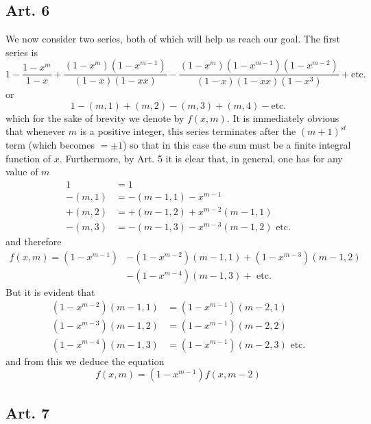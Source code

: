 \documentclass{book}
\theoremstyle{plain}
\theoremstyle{remark}
\begin{document}
\subsection*{Art. 6} 

We now consider two series, both of which will help us reach our goal.  The first series is 
\[ 1 - \frac{1-x^m}{1-x} + \frac{(1-x^m)(1-x^{m-1})}{(1-x)(1-xx)} - \frac{(1-x^m)(1-x^{m-1})(1-x^{m-2})}{(1-x)(1-xx)(1-x^3)} + \textrm{etc.} \]
or 
\[ 1 - (m,1)+(m,2)-(m,3)+(m,4) - \textrm{etc.} \]
which for the sake of brevity we denote by $f(x,m)$.  It is immediately obvious that whenever $m$ is a positive integer, this series terminates after the $(m+1)^{st}$ term (which becomes $=\pm1$) so that in this case the sum must be a finite integral function of $x$.  Furthermore, by Art. 5 it is clear that, in general, one has for any value of $m$ 
\begin{align*} 
1 &= 1 \\
-(m,1) &= -(m-1,1)-x^{m-1} \\
+(m,2) &= +(m-1,2) + x^{m-2} (m-1,1) \\
-(m,3) &= -(m-1,3) - x^{m-3} (m-1,2) \textrm{ etc.} 
\end{align*}
and therefore
\begin{align*} f(x,m) = (1-x^{m-1}) &- (1-x^{m-2})(m-1,1) + (1-x^{m-3})(m-1,2)  \\
&-(1-x^{m-4}) (m-1,3) + \textrm{ etc.} \end{align*}
But it is evident that
\begin{align*}
 (1-x^{m-2})(m-1,1) &= (1-x^{m-1}) (m-2,1) \\
(1-x^{m-3})(m-1,2) &= (1-x^{m-1}) (m-2,2) \\
(1-x^{m-4})(m-1,3) &= (1-x^{m-1}) (m-2,3)  \textrm{ etc.} 
\end{align*}
and from this we deduce the equation
\begin{equation} f(x,m) = (1-x^{m-1}) f(x,m-2) \label{eqn1} \end{equation}

\subsection*{Art. 7} 
\end{document}
